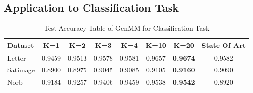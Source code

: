 \subsection{Application to Classification Task}
\begin{table}[!t]
  \caption{Test Accuracy Table of GenMM for Classification Task}\label{tab:acc-classification}
  \begin{tabular}{lccccccc} \toprule
    {Dataset} &  K=1 &  K=2 &  K=3 &  K=4 & K=10 & K=20 & State Of Art \\ \midrule
    Letter & 0.9459 &  0.9513 & 0.9578  & 0.9581 & 0.9657 & \textbf{0.9674} & {0.9582} \cite{tang2016extreme} \\ \midrule
    Satimage & 0.8900 & 0.8975 & 0.9045 & 0.9085 & 0.9105 & \textbf{0.9160} & 0.9090 \cite{jiang2013k-svd}   \\ \midrule
    Norb & 0.9184 & 0.9257 & 0.9406 & 0.9459 & 0.9538 & \textbf{0.9542} & 0.8920 \cite{pmlr-v5-salakhutdinov09a}  \\
    \bottomrule
  \end{tabular}
\end{table}

